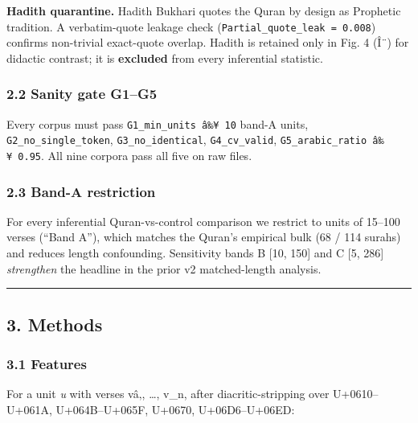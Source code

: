 \documentclass[
]{article}
\begin{document}
\textbf{Hadith quarantine.} Hadith Bukhari quotes the Quran by design as
Prophetic tradition. A verbatim-quote leakage check
(\texttt{Partial\_quote\_leak\ =\ 0.008}) confirms non-trivial
exact-quote overlap. Hadith is retained only in Fig. 4 (Î¨) for didactic
contrast; it is \textbf{excluded} from every inferential statistic.

\subsubsection{2.2 Sanity gate G1--G5}\label{sanity-gate-g1g5}

Every corpus must pass \texttt{G1\_min\_units\ â‰¥\ 10} band-A units,
\texttt{G2\_no\_single\_token}, \texttt{G3\_no\_identical},
\texttt{G4\_cv\_valid}, \texttt{G5\_arabic\_ratio\ â‰¥\ 0.95}. All nine
corpora pass all five on raw files.

\subsubsection{2.3 Band-A restriction}\label{band-a-restriction}

For every inferential Quran-vs-control comparison we restrict to units
of 15--100 verses (``Band A''), which matches the Quran's empirical bulk
(68 / 114 surahs) and reduces length confounding. Sensitivity bands B
{[}10, 150{]} and C {[}5, 286{]} \emph{strengthen} the headline in the
prior v2 matched-length analysis.

\begin{center}\rule{0.5\linewidth}{0.5pt}\end{center}

\subsection{3. Methods}\label{methods}

\subsubsection{3.1 Features}\label{features}

For a unit \emph{u} with verses vâ‚, \ldots, v\_n, after
diacritic-stripping over U+0610--U+061A, U+064B--U+065F, U+0670,
U+06D6--U+06ED:
\end{document}
